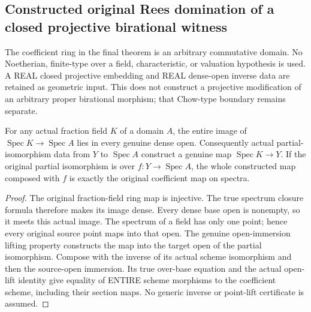\subsection{Constructed original Rees domination of a closed projective birational witness}

The coefficient ring in the final theorem is an arbitrary commutative domain.
No Noetherian, finite-type over a field, characteristic, or valuation hypothesis is
used. A REAL closed projective embedding and REAL dense-open inverse data are
retained as geometric input. This does not construct a projective modification of
an arbitrary proper birational morphism; that Chow-type boundary remains separate.

\begin{lemma}
\label{scheme:actual-partial-iso-fraction-lift}
For any actual fraction field $K$ of a domain $A$, the entire image of
$\operatorname{Spec}K\to\operatorname{Spec}A$ lies in every genuine dense open.
Consequently actual partial-isomorphism data from $Y$ to $\operatorname{Spec}A$
construct a genuine map $\operatorname{Spec}K\to Y$. If the original partial
isomorphism is over $f:Y\to\operatorname{Spec}A$, the whole constructed map
composed with $f$ is exactly the original coefficient map on spectra.
\leanok
\end{lemma}
\begin{proof}
The original fraction-field ring map is injective. The true spectrum closure
formula therefore makes its image dense. Every dense base open is nonempty,
so it meets this actual image. The spectrum of a field has only one point;
hence every original source point maps into that open. The genuine
open-immersion lifting property constructs the map into the target open of the
partial isomorphism. Compose with the inverse of its actual scheme isomorphism
and then the source-open immersion. Its true over-base equation and the actual
open-lift identity give equality of ENTIRE scheme morphisms to the coefficient
scheme, including their section maps. No generic inverse or point-lift
certificate is assumed.
\end{proof}

